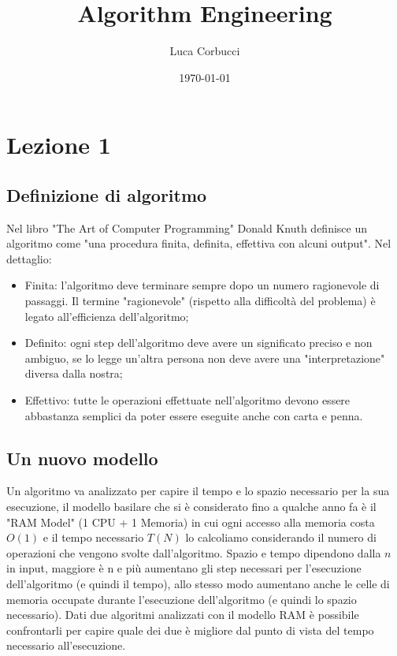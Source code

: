 \documentclass[14pt]{extreport}
\title{Algorithm Engineering}
\author{Luca Corbucci}
\date{\today}
\begin{document}
\maketitle

\tableofcontents

\chapter{Lezione 1}

\section{Definizione di algoritmo}

Nel libro "The Art of Computer Programming" Donald Knuth definisce un algoritmo come "una procedura finita, definita, effettiva con alcuni output". Nel dettaglio:
\begin{itemize}
    \item Finita: l'algoritmo deve terminare sempre dopo un numero ragionevole di passaggi. Il termine "ragionevole" (rispetto alla difficoltà del problema) è legato all'efficienza dell'algoritmo;
    \item Definito: ogni step dell'algoritmo deve avere un significato preciso e non ambiguo, se lo legge un'altra persona non deve avere una "interpretazione" diversa dalla nostra;
    \item Effettivo: tutte le operazioni effettuate nell'algoritmo devono essere abbastanza semplici da poter essere eseguite anche con carta e penna.
\end{itemize}

\section{Un nuovo modello}

Un algoritmo va analizzato per capire il tempo e lo spazio necessario per la sua esecuzione, il modello basilare che si è considerato fino a qualche anno fa è il "RAM Model" (1 CPU + 1 Memoria) in cui ogni accesso alla memoria costa $O(1)$ e il tempo necessario $T(N)$ lo calcoliamo considerando il numero di operazioni che vengono svolte dall'algoritmo. Spazio e tempo dipendono dalla $n$ in input, maggiore è n e più aumentano gli step necessari per l'esecuzione dell'algoritmo (e quindi il tempo), allo stesso modo aumentano anche le celle di memoria occupate durante l'esecuzione dell'algoritmo (e quindi lo spazio necessario).
Dati due algoritmi analizzati con il modello RAM è possibile confrontarli per capire quale dei due è migliore dal punto di vista del tempo necessario all'esecuzione.
\end{document}
